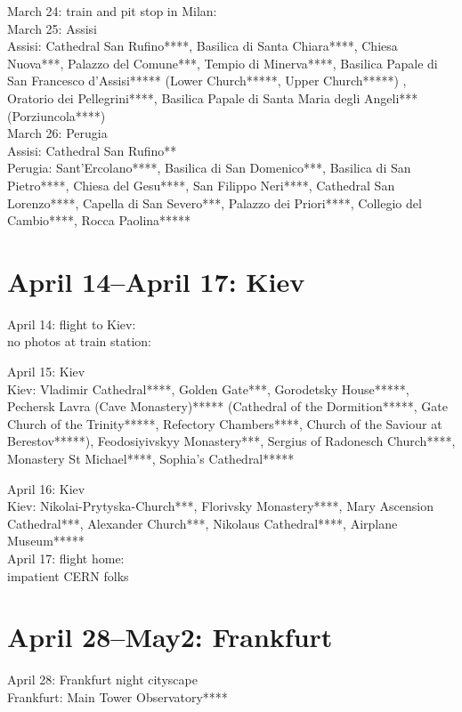 March 24: train and pit stop in Milan:\\

March 25: Assisi\\
Assisi: Cathedral San Rufino****, Basilica di Santa Chiara****, Chiesa Nuova***, Palazzo del Comune***, Tempio di Minerva****, Basilica Papale di San Francesco d'Assisi***** (Lower Church*****, Upper Church*****) , Oratorio dei Pellegrini****, Basilica Papale di Santa Maria degli Angeli*** (Porziuncola****)\\

March 26: Perugia\\
Assisi: Cathedral San Rufino**\\
Perugia: Sant'Ercolano****, Basilica di San Domenico***, Basilica di San Pietro****, Chiesa del Gesu****, San Filippo Neri****, Cathedral San Lorenzo****, Capella di San Severo***, Palazzo dei Priori****, Collegio del Cambio****, Rocca Paolina*****

\section{April 14--April 17: Kiev}
\label{Kiev2017}

April 14: flight to Kiev:\\
no photos at train station:

April 15: Kiev\\
Kiev: Vladimir Cathedral****, Golden Gate***, Gorodetsky House*****, Pechersk Lavra (Cave Monastery)***** (Cathedral of the Dormition*****, Gate Church of the Trinity*****, Refectory Chambers****, Church of the Saviour at Berestov*****), Feodosiyivskyy Monastery***, Sergius of Radonesch Church****, Monastery St Michael****, Sophia's Cathedral*****

April 16: Kiev\\
Kiev: Nikolai-Prytyska-Church***, Florivsky Monastery****, Mary Ascension Cathedral***, Alexander Church***, Nikolaus Cathedral****, Airplane Museum*****\\

April 17: flight home:\\
impatient CERN folks

\section{April 28--May2: Frankfurt}
\label{Frankfurt2017}

April 28: Frankfurt night cityscape\\
Frankfurt: Main Tower Observatory****\\

